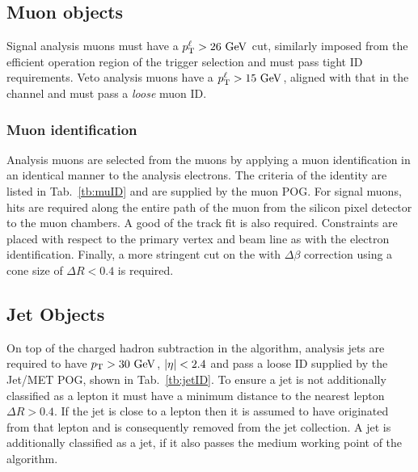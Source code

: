 
\subsection{Muon objects}
\label{sec:mu}

Signal analysis muons must have a $p_{\mathrm{T}}^{\ell}>26\mathrm{~Ge\hspace{-.08em}V}^{}$ cut, similarly imposed from the efficient operation region of the \muTrigger{} trigger selection and must pass tight ID requirements.
Veto analysis muons have a $p_{\mathrm{T}}^{\ell}>15\mathrm{~Ge\hspace{-.08em}V}^{}$, aligned with that in the \eJets{} channel and must pass a \textit{loose} muon ID.

\subsubsection{Muon identification}
Analysis muons are selected from the \PF{} muons by applying a muon identification in an identical manner to the analysis electrons.
The criteria of the identity are listed in Tab.~\ref{tb:muID} and are supplied by the muon POG.
For signal muons, hits are required along the entire path of the muon from the silicon pixel detector to the muon chambers.
A good \chisndf{} of the track fit is also required.
Constraints are placed with respect to the primary vertex and beam line as with the electron identification.
Finally, a more stringent cut on the \PF{} \Irel{} with $\Delta\beta$ correction using a cone size of $\Delta R < 0.4$ is required.


\subsection{Jet Objects}
\label{sec:jet}

On top of the charged hadron subtraction in the \PF{} algorithm, analysis jets are required to have $p_{\mathrm{T}}>30\mathrm{~Ge\hspace{-.08em}V}^{}$, $\lvert \eta \rvert<2.4$ and pass a loose ID supplied by the Jet/MET POG, shown in Tab.~\ref{tb:jetID}.
To ensure a jet is not additionally classified as a lepton it must have a minimum distance to the nearest lepton $\Delta R > 0.4$.
If the jet is close to a lepton then it is assumed to have originated from that lepton and is consequently removed from the jet collection. 
A jet is additionally classified as a \bquark{} jet, if it also passes the medium working point of the \CSV{} algorithm.


